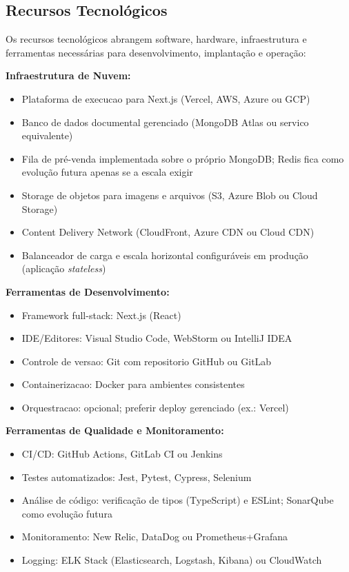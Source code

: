 \subsection{Recursos Tecnológicos}

Os recursos tecnológicos abrangem software, hardware, infraestrutura e ferramentas necessárias para desenvolvimento, implantação e operação:

\textbf{Infraestrutura de Nuvem:}
\begin{itemize}
    \item Plataforma de execucao para Next.js (Vercel, AWS, Azure ou GCP)
    \item Banco de dados documental gerenciado (MongoDB Atlas ou servico equivalente)
    \item Fila de pré-venda implementada sobre o próprio MongoDB; Redis fica como evolução futura apenas se a escala exigir
    \item Storage de objetos para imagens e arquivos (S3, Azure Blob ou Cloud Storage)
    \item Content Delivery Network (CloudFront, Azure CDN ou Cloud CDN)
    \item Balanceador de carga e escala horizontal configuráveis em produção (aplicação \textit{stateless})
\end{itemize}

\textbf{Ferramentas de Desenvolvimento:}
\begin{itemize}
    \item Framework full-stack: Next.js (React)
    \item IDE/Editores: Visual Studio Code, WebStorm ou IntelliJ IDEA
    \item Controle de versao: Git com repositorio GitHub ou GitLab
    \item Containerizacao: Docker para ambientes consistentes
    \item Orquestracao: opcional; preferir deploy gerenciado (ex.: Vercel)
\end{itemize}

\textbf{Ferramentas de Qualidade e Monitoramento:}
\begin{itemize}
    \item CI/CD: GitHub Actions, GitLab CI ou Jenkins
    \item Testes automatizados: Jest, Pytest, Cypress, Selenium
    \item Análise de código: verificação de tipos (TypeScript) e ESLint; SonarQube como evolução futura
    \item Monitoramento: New Relic, DataDog ou Prometheus+Grafana
    \item Logging: ELK Stack (Elasticsearch, Logstash, Kibana) ou CloudWatch
\end{itemize}

